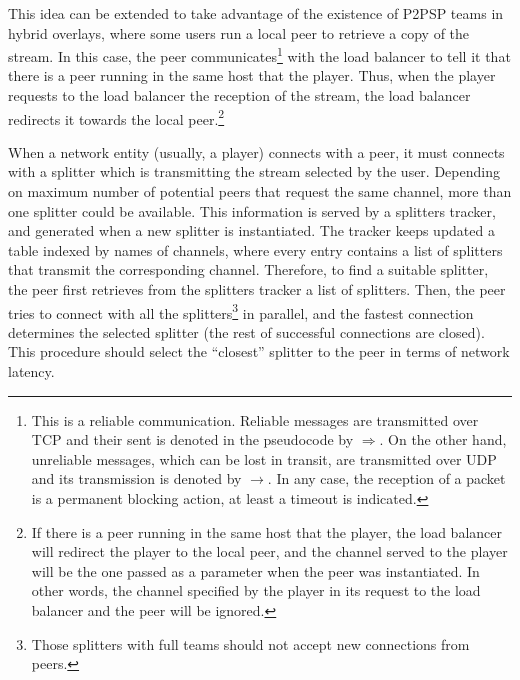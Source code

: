 This idea can be extended to take advantage of the existence of P2PSP
teams in hybrid overlays, where some users run a local peer to
retrieve a copy of the stream. In this case, the peer
communicates\footnote{This is a reliable communication. Reliable
  messages are transmitted over TCP and their sent is denoted in the
  pseudocode by $\Rightarrow$. On the other hand, unreliable messages,
  which can be lost in transit, are transmitted over UDP and its
  transmission is denoted by $\rightarrow$. In any case, the reception
  of a packet is a permanent blocking action, at least a timeout is
  indicated.} with the load balancer to tell it that there is a peer
running in the same host that the player. Thus, when the player
requests to the load balancer the reception of the stream, the load
balancer redirects it towards the local peer.\footnote{If there is a
  peer running in the same host that the player, the load balancer
  will redirect the player to the local peer, and the channel served
  to the player will be the one passed as a parameter when the peer
  was instantiated. In other words, the channel specified by the
  player in its request to the load balancer and the peer will be
  ignored.}

When a network entity (usually, a player) connects with a peer, it
must connects with a splitter which is transmitting the stream
selected by the user. Depending on maximum number of potential peers that
request the same channel, more than one splitter could be
available. This information is served by a splitters tracker, and
generated when a new splitter is instantiated. The tracker keeps
updated a table indexed by names of channels, where every entry
contains a list of splitters that transmit the corresponding
channel. Therefore, to find a suitable splitter, the peer first
retrieves from the splitters tracker a list of splitters. Then, the
peer tries to connect with all the splitters\footnote{Those splitters
  with full teams should not accept new connections from peers.} in
parallel, and the fastest connection determines the selected splitter
(the rest of successful connections are closed). This procedure should
select the ``closest'' splitter to the peer in terms of network
latency.


